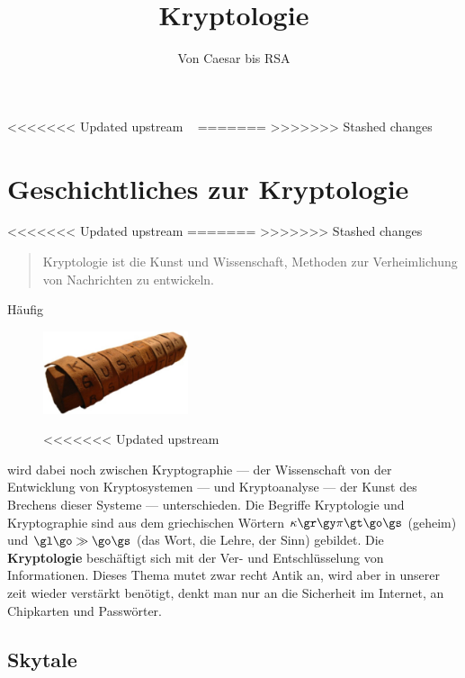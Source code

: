 \documentclass[%
<<<<<<< Updated upstream
11pt,%
twoside,%
titlepage,%
german,%
headsepline%
]{scrartcl}
\title{Kryptologie}
\subtitle{Von Caesar bis RSA}
\author{}
\date{}
\begin{document}
\maketitle

<<<<<<< Updated upstream
\newpage\thispagestyle{empty}~
=======
\newpage\thispagestyle{empty}
>>>>>>> Stashed changes
\newpage

\tableofcontents
\cleardoublepage

\section{Geschichtliches zur Kryptologie}
<<<<<<< Updated upstream
=======
>>>>>>> Stashed changes
\begin{quote}
Kryptologie ist die Kunst und Wissenschaft, Methoden zur Verheimlichung von Nachrichten zu entwickeln.
\end{quote}

Häufig
\begin{figure}
  \begin{center}
    \includegraphics[width=0.38\textwidth]{pictures/skytale}
  \end{center}
<<<<<<< Updated upstream
\end{figure}
wird dabei noch zwischen Kryptographie --- der Wissenschaft von der Entwicklung von Kryptosystemen --- und Kryptoanalyse --- der Kunst des Brechens dieser Systeme --- unterschieden. Die Begriffe Kryptologie und Kryptographie sind aus dem griechischen W\"ortern $\kappa\gr\gy\pi\gt\go\gs$ (geheim) und $\gl\go\gg\go\gs$ (das Wort, die Lehre, der Sinn) gebildet.
Die \textbf{Kryptologie} beschäftigt sich mit der Ver- und Entschlüsselung von Informationen. Dieses Thema mutet zwar recht Antik an, wird aber in unserer zeit wieder verstärkt ben\"otigt, denkt man nur an die Sicherheit im Internet, an Chipkarten und Passw\"orter.

\subsection{Skytale}
\end{document}
